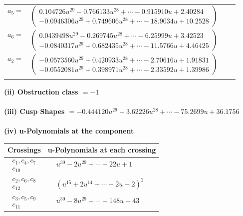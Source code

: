 \documentclass[1p]{elsarticle_modified}
\theoremstyle{definition}
\begin{document}
\begin{tabular}{m{7pt} m{180pt} m{7pt} m{180pt} }
\flushright $a_{5}=$&$\begin{pmatrix}0.104726 u^{29}-0.766133 u^{28}+\cdots-0.915910 u+2.40284\\-0.0946306 u^{29}+0.749606 u^{28}+\cdots-18.9034 u+10.2528\end{pmatrix}$ \\
\flushright $a_{6}=$&$\begin{pmatrix}0.0439498 u^{29}-0.269745 u^{28}+\cdots-6.25999 u+3.42523\\-0.0840317 u^{29}+0.682435 u^{28}+\cdots-11.5766 u+4.46425\end{pmatrix}$ \\
\flushright $a_{2}=$&$\begin{pmatrix}-0.0573560 u^{29}+0.420933 u^{28}+\cdots-2.70616 u+1.91831\\-0.0552081 u^{29}+0.398971 u^{28}+\cdots-2.33592 u+1.39986\end{pmatrix}$\\&\end{tabular}
\flushleft \textbf{(ii) Obstruction class $= -1$}\\~\\
\flushleft \textbf{(iii) Cusp Shapes $= -0.444120 u^{29}+3.62226 u^{28}+\cdots-75.2699 u+36.1756$}\\~\\
\newpage\renewcommand{\arraystretch}{1}
\flushleft \textbf{(iv) u-Polynomials at the component}\newline \\
\begin{tabular}{m{50pt}|m{274pt}}
Crossings & \hspace{64pt}u-Polynomials at each crossing \\
\hline $$\begin{aligned}c_{1},c_{4},c_{7}\\c_{10}\end{aligned}$$&$\begin{aligned}
&u^{30}-2 u^{29}+\cdots+22 u+1
\end{aligned}$\\
\hline $$\begin{aligned}c_{2},c_{6},c_{8}\\c_{12}\end{aligned}$$&$\begin{aligned}
&(u^{15}+2 u^{14}+\cdots-2 u-2)^{2}
\end{aligned}$\\
\hline $$\begin{aligned}c_{3},c_{5},c_{9}\\c_{11}\end{aligned}$$&$\begin{aligned}
&u^{30}-8 u^{29}+\cdots-148 u+43
\end{aligned}$\\
\hline
\end{tabular}\\~\\
\end{document}
